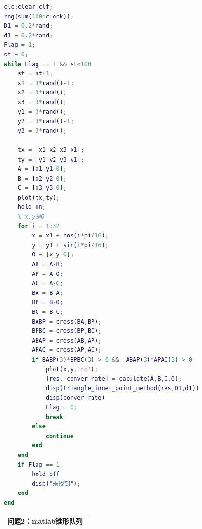 \documentclass{my_paper}
\begin{document}
\begin{lstlisting}[language=Matlab]
clc;clear;clf;
rng(sum(100*clock));
D1 = 0.2*rand;
d1 = 0.2*rand;
Flag = 1;
st = 0;
while Flag == 1 && st<100
    st = st+1;
    x1 = 3*rand()-1;
    x2 = 3*rand();
    x3 = 3*rand();
    y1 = 3*rand();
    y2 = 3*rand()-1;
    y3 = 3*rand();

    tx = [x1 x2 x3 x1];
    ty = [y1 y2 y3 y1];
    A = [x1 y1 0]; 
    B = [x2 y2 0]; 
    C = [x3 y3 0]; 
    plot(tx,ty);
    hold on;
    % x,y是O
    for i = 1:32
        x = x1 + cos(i*pi/16);
        y = y1 + sin(i*pi/16);
        O = [x y 0]; 
        AB = A-B;
        AP = A-O;
        AC = A-C;
        BA = B-A;
        BP = B-O;
        BC = B-C;
        BABP = cross(BA,BP);
        BPBC = cross(BP,BC);
        ABAP = cross(AB,AP);
        APAC = cross(AP,AC);
        if BABP(3)*BPBC(3) > 0 &&  ABAP(3)*APAC(3) > 0
            plot(x,y,'ro');
            [res, conver_rate] = caculate(A,B,C,O);
            disp(triangle_inner_point_method(res,D1,d1))
            disp(conver_rate)
            Flag = 0;
            break
        else
            continue
        end
    end
    if Flag == 1
        hold off
        disp("未找到");
    end
end
\end{lstlisting}


\begin{table}[htbp]
    \centering
    \begin{tabular}{|p{14.0cm}|}
    \hline
    \textbf{问题2：matlab锥形队列} \\ %
    \hline
    \end{tabular}
\end{table}
\end{document}
